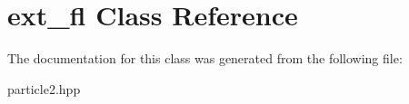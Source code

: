\hypertarget{classext__fl}{}\section{ext\+\_\+fl Class Reference}
\label{classext__fl}


The documentation for this class was generated from the following file\+:\begin{DoxyCompactItemize}
\item 
particle2.\+hpp\end{DoxyCompactItemize}

